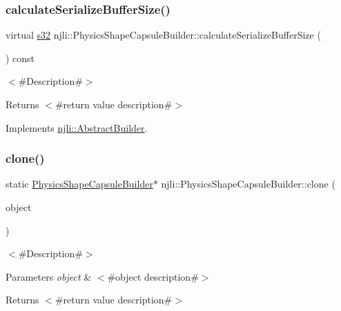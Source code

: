 \subsubsection{\texorpdfstring{calculate\+Serialize\+Buffer\+Size()}{calculateSerializeBufferSize()}}
{\footnotesize\ttfamily virtual \mbox{\hyperlink{_util_8h_aa62c75d314a0d1f37f79c4b73b2292e2}{s32}} njli\+::\+Physics\+Shape\+Capsule\+Builder\+::calculate\+Serialize\+Buffer\+Size (\begin{DoxyParamCaption}{ }\end{DoxyParamCaption}) const\hspace{0.3cm}{\ttfamily [virtual]}}

$<$\#\+Description\#$>$

\begin{DoxyReturn}{Returns}
$<$\#return value description\#$>$ 
\end{DoxyReturn}


Implements \mbox{\hyperlink{classnjli_1_1_abstract_builder_aa1d220053e182c37b31b427499c6eacf}{njli\+::\+Abstract\+Builder}}.

\mbox{\label{classnjli_1_1_physics_shape_capsule_builder_ae9612d564c92dd65492bf4a1115243a8}} 
\subsubsection{\texorpdfstring{clone()}{clone()}}
{\footnotesize\ttfamily static \mbox{\hyperlink{classnjli_1_1_physics_shape_capsule_builder}{Physics\+Shape\+Capsule\+Builder}}$\ast$ njli\+::\+Physics\+Shape\+Capsule\+Builder\+::clone (\begin{DoxyParamCaption}\item[{const \mbox{\hyperlink{classnjli_1_1_physics_shape_capsule_builder}{Physics\+Shape\+Capsule\+Builder}} \&}]{object }\end{DoxyParamCaption})\hspace{0.3cm}{\ttfamily [static]}}

$<$\#\+Description\#$>$


\begin{DoxyParams}{Parameters}
{\em object} & $<$\#object description\#$>$\\
\hline
\end{DoxyParams}
\begin{DoxyReturn}{Returns}
$<$\#return value description\#$>$ 
\end{DoxyReturn}
\mbox{\label{classnjli_1_1_physics_shape_capsule_builder_a8e2a13fc6a5c9c67231f9987523590f6}} 
